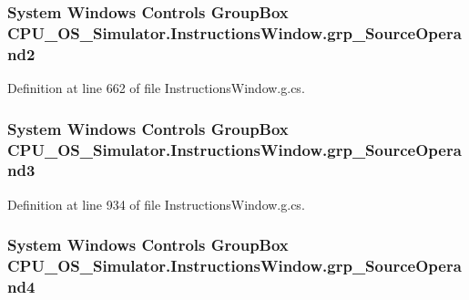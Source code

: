 \subsubsection[{grp\+\_\+\+Source\+Operand2}]{\setlength{\rightskip}{0pt plus 5cm}System Windows Controls Group\+Box C\+P\+U\+\_\+\+O\+S\+\_\+\+Simulator.\+Instructions\+Window.\+grp\+\_\+\+Source\+Operand2\hspace{0.3cm}{\ttfamily [package]}}\label{class_c_p_u___o_s___simulator_1_1_instructions_window_ad37aae3614abd76749236a7739fbc18b}


Definition at line 662 of file Instructions\+Window.\+g.\+cs.

\hypertarget{class_c_p_u___o_s___simulator_1_1_instructions_window_a59e5e9da77976ce8f2d8a43528b98f63}{}
\subsubsection[{grp\+\_\+\+Source\+Operand3}]{\setlength{\rightskip}{0pt plus 5cm}System Windows Controls Group\+Box C\+P\+U\+\_\+\+O\+S\+\_\+\+Simulator.\+Instructions\+Window.\+grp\+\_\+\+Source\+Operand3\hspace{0.3cm}{\ttfamily [package]}}\label{class_c_p_u___o_s___simulator_1_1_instructions_window_a59e5e9da77976ce8f2d8a43528b98f63}


Definition at line 934 of file Instructions\+Window.\+g.\+cs.

\hypertarget{class_c_p_u___o_s___simulator_1_1_instructions_window_a0efec3cdad460e3596a699716e0a24e9}{}
\subsubsection[{grp\+\_\+\+Source\+Operand4}]{\setlength{\rightskip}{0pt plus 5cm}System Windows Controls Group\+Box C\+P\+U\+\_\+\+O\+S\+\_\+\+Simulator.\+Instructions\+Window.\+grp\+\_\+\+Source\+Operand4\hspace{0.3cm}{\ttfamily [package]}}\label{class_c_p_u___o_s___simulator_1_1_instructions_window_a0efec3cdad460e3596a699716e0a24e9}



